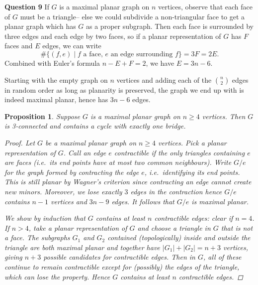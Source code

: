 \documentclass[12pt]{article}
\newtheorem*{prop}{Proposition}
\begin{document}
\textbf{Question 9}\quad 
If \(G\) is a maximal planar graph on \(n\) vertices, observe that each face of
\(G\) must be a triangle-- else we could subdivide a non-triangular face to get
a planar graph which has \(G\) as a proper subgraph. Then each face is
surrounded by three edges and each edge by two faces, so if a planar
representation of \(G\) has \(F\) faces and \(E\) edges, we can write  
\[\#\{(f,e)\;|\;f\text{ a face, } e\text{ an edge surrounding }f\} = 3F = 2E.\]
Combined with Euler's formula \(n-E+F=2\), we have \(E= 3n-6\). 

Starting with the empty graph on \(n\) vertices and adding each of the
\(\binom{n}{2}\) edges in random order as long as planarity is preserved, the
graph we end up with is indeed maximal planar, hence has \(3n-6\) edges. 

\begin{prop}
    Suppose \(G\) is a maximal planar graph on \(n\geq 4\) vertices. Then \(G\)
    is 3-connected and contains a cycle with exactly one bridge.
    \begin{proof}
        Let \(G\) be a maximal planar graph on \(n\geq 4\) vertices. Pick a
        planar representation of \(G\). Call an edge \(e\) \emph{contractible}
        if the only triangles containing \(e\) are faces (i.e.\ its end points
        have at most two common neighbours). Write \(G/e\) for
        the graph formed by contracting the edge \(e\), i.e.\ identifying its
        end points. This is still planar by Wagner's criterion since contracting
        an edge cannot create new minors.  Moreover, we lose exactly \(3\) edges
        in the contraction hence \(G/e\) contains \(n-1\) vertices and \(3n -
        9\) edges. It follows that \(G/e\) is maximal planar.

        We show by induction that \(G\) contains at least \(n\) contractible
        edges: clear if \(n=4\). If \(n>4\), take a planar representation of
        \(G\) and choose a triangle in \(G\) that is not a face. The subgraphs
        \(G_1\) and \(G_2\) contained (topologically) inside and outside the
        triangle are both maximal planar and together have \(|G_1|+|G_2| =
        n+3\) vertices, giving \(n+3\) possible candidates for contractible
        edges. Then in \(G\), all of these continue to remain contractible
        except for (possibly) the edges of the triangle, which can lose the
        property. Hence \(G\) contains at least \(n\) contractible edges.  


\end{proof}
\end{prop}
\end{document}
